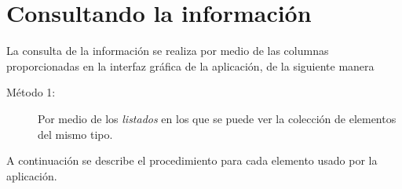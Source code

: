 \chapter{Consultando la informaci\'on}
\label{sec:consultandoLaInformacion}
La consulta de la informaci\'on se realiza por medio de las columnas proporcionadas en la interfaz gráfica de la aplicación, de la siguiente manera

\begin{description}
  \item[M\'etodo 1:]Por medio de los \emph{listados} en los que se puede ver la
  colecci\'on de elementos del mismo tipo.
  
\end{description}

A continuaci\'on se describe el procedimiento para cada elemento usado por la
aplicaci\'on.

















